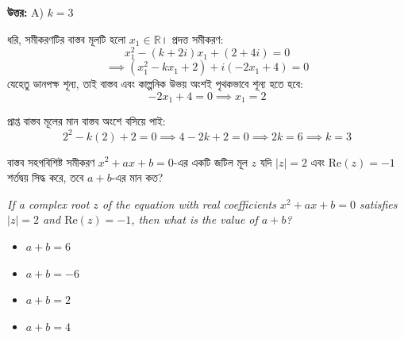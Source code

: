 \documentclass[12pt, a4paper]{article}
\begin{document}
\vspace{0.5em}
\begin{tcolorbox}[answerbox]
    \textbf{\color{success} উত্তর:} A) $k = 3$
\end{tcolorbox}
\vspace{1em}

\begin{tcolorbox}[solutionbox={সমাধান (Solution)}]
    \noindent
    ধরি, সমীকরণটির বাস্তব মূলটি হলো $x_1 \in \mathbb{R}$। প্রদত্ত সমীকরণ:
    \[ x_1^2 - (k+2i)x_1 + (2+4i) = 0 \]
    \[ \implies (x_1^2 - k x_1 + 2) + i(-2x_1 + 4) = 0 \]
    যেহেতু ডানপক্ষ শূন্য, তাই বাস্তব এবং কাল্পনিক উভয় অংশই পৃথকভাবে শূন্য হতে হবে:
    \[ -2x_1 + 4 = 0 \implies x_1 = 2 \]
    
    \vspace{0.5em}
    প্রাপ্ত বাস্তব মূলের মান বাস্তব অংশে বসিয়ে পাই:
    \[ 2^2 - k(2) + 2 = 0 \implies 4 - 2k + 2 = 0 \implies 2k = 6 \implies k = 3 \]
\end{tcolorbox}
\vspace{1em}

\begin{tcolorbox}[questionbox={প্রশ্ন (Question) 48}]
    \noindent
    বাস্তব সহগবিশিষ্ট সমীকরণ $x^2 + ax + b = 0$-এর একটি জটিল মূল $z$ যদি $|z| = 2$ এবং $\text{Re}(z) = -1$ শর্তদ্বয় সিদ্ধ করে, তবে $a+b$-এর মান কত?
    
    \vspace{0.8em}
    \begin{english}
    \noindent\textit{\color{darkgray}
    If a complex root $z$ of the equation with real coefficients $x^2 + ax + b = 0$ satisfies $|z| = 2$ and $\text{Re}(z) = -1$, then what is the value of $a+b$?
    }
    \end{english}
\end{tcolorbox}

\begin{itemize}[label={}, leftmargin=1cm, itemsep=0.5em]
    \item[\textbf{A)}] $a+b = 6$
    \item[\textbf{B)}] $a+b = -6$
    \item[\textbf{C)}] $a+b = 2$
    \item[\textbf{D)}] $a+b = 4$
\end{itemize}
\end{document}
